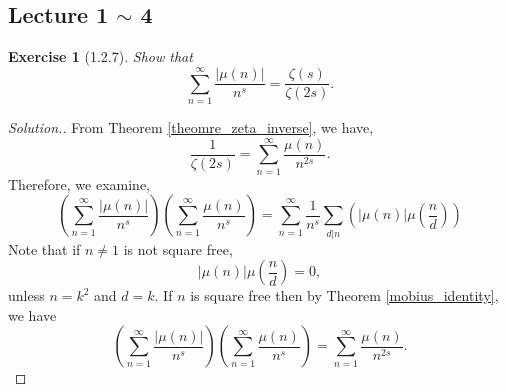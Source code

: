 \documentclass{article}
\newtheorem{exercise}{Exercise}[section]
\begin{document}
\subsection{Lecture 1 $\sim$ 4}
\begin{exercise}[1.2.7]
  \label{exercise_1.2.7}
  Show that 
  \begin{equation*}
    \sum_{n=1}^\infty {\frac {\vert \mu(n)\vert} {n^s}} = {\frac {\zeta(s)} {\zeta(2s)}}.
  \end{equation*}
\end{exercise}
\begin{proof}[Solution.]
  From Theorem \ref{theomre_zeta_inverse}, we have,
  \begin{equation*}
  {\frac 1 {\zeta(2s)}} = \sum_{n=1}^\infty {\frac {\mu(n)} {n^{2s}}}.
  \end{equation*}
  Therefore, we examine,
  \begin{equation*}
    \left(\sum_{n=1}^\infty {\frac {\vert \mu(n)\vert} {n^s}} \right)\left(\sum_{n=1}^\infty {\frac {\mu(n)} {n^s}}\right) = \sum_{n=1}^\infty{\frac 1 {n^s}}\sum_{d|n}\left(\vert \mu(n)\vert\mu\left({\frac n d}\right)\right)
  \end{equation*}
  Note that if $n\not=1$ is not square free, 
  \begin{equation*}
    \vert \mu(n)\vert\mu\left({\frac n d}\right)=0,
  \end{equation*}
  unless $n=k^2$ and $d=k$. If $n$ is square free then by Theorem \ref{mobius_identity}, we have
  \begin{equation*}
    \left(\sum_{n=1}^\infty {\frac {\vert \mu(n)\vert} {n^s}} \right)\left(\sum_{n=1}^\infty {\frac {\mu(n)} {n^s}}\right) = \sum_{n=1}^\infty{\frac {\mu(n)} {n^{2s}}}.
  \end{equation*}
\end{proof}
\end{document}
